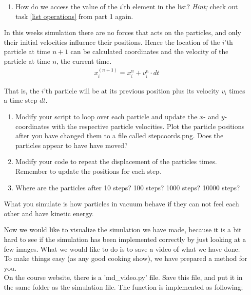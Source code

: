 \documentclass{article}
\begin{document}
\begin{enumerate}[resume]
  \item How do we access the value of the $i$'th element in the  list?
      {\em Hint;} check out task \ref{list operations} from part 1 again.

\end{enumerate}

In this weeks simulation there are no forces that acts on the particles, and only their initial velocities influence their positions.
Hence the location of the $i$'th particle at time $n+1$ can be calculated coordinates and the velocity of the
particle at time $n$, the current time.
\begin{align}
  x_i^{(n+1)} = x^n_i + v_{i}^n \cdot dt
\end{align}

That is, the $i$'th particle will be at its previous position plus its velocity $v_i$ times a time step $dt$.

\begin{enumerate}[resume]
  \item
    Modify your script to loop over each particle and update the $x$- and $y$-coordinates with the respective particle velocities.
    Plot the particle positions after you have changed them to a file called stepcoords.png.
    Does the particles appear to have have moved?

  \item Modify your code to repeat the displacement of the particles  times.
      Remember to update the positions for each step.

  \item Where are the particles after 10 steps? 100 steps? 1000 steps? 10000 steps?

\end{enumerate}

What you simulate is how particles in vacuum behave if they can not feel each other and have kinetic energy.\\

\newpage

Now we would like to visualize the simulation we have made, because it is a bit hard to see if the simulation has been implemented correctly by just looking at a few images.
What we would like to do is to save a video of what we have done.
To make things easy (as any good cooking show), we have prepared a method for you.\\

On the course website, there is a 'md\_video.py' file.
Save this file, and put it in the same folder as the simulation file.
The function is implemented as following;
\end{document}

